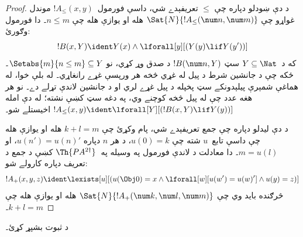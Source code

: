 \documentclass[../../../include/open-logic-section]{subfiles}
\begin{document}
\begin{proof}
د دې ښودلو دپاره چې $\le$ تعريفېدے شي، داسې فورمول~$!A_\le(x, y)$
موندل غواړو چې $\Sat{N}{!A_\le(\num n, \num m)}$ هله او يوازې هله
چې $n \le m$۔ دا فورمول وګورئ:
\[
!B(x, Y) \ident Y(x) \land \lforall[y][(Y(y) \lif Y(y'))]
\]
که د~$Y \subseteq \Nat$ سټ $!B(\num n, Y)$ د صدق وړ کړي، نو $\Setabs{m}{n \le m} \subseteq Y$۔ ځکه چې د جانشين شرط د پيل له غړي څخه هر ورپسې غړے رانغاړي۔ له بلې خوا، له هماغې شمېرې پيلېدونکے سټ پخپله د پيل غړے لري او د جانشين لاندې تړلے دے۔ نو هر هغه عدد چې له پيل څخه کوچنے وي، په دغه سټ کښې نشته؛ له دې امله
$!A_\le(x, y) \ident \lforall[Y][(!B(x, Y) \lif Y(y))]$ اخيستلے شو۔

د دې ليدلو دپاره چې جمع تعريفېدے شي، پام وکړئ چې $k+l=m$ هله او
يوازې هله چې داسې تابع~$u$ شته چې $u(0)=k$، د هر $n$ دپاره
$u(n')=u(n)'$، او $m = u(l)$۔ دا معادلت د لاندې فورمول په وسيله
په~$\Th{PA^{2\dagger}}$ کښې د جمع د تعريف دپاره کارولے شو:
\[
!A_+(x,y,z) \ident \lexists[u][(u(\Obj 0)=x \land \lforall[w][u(w')=u
 (w)'] \land u(y)=z)]
\] 
څرګنده بايد وي چې $\Sat{N}{!A_+(\num k, \num l, \num m)}$ هله او
يوازې هله چې $k+l=m$۔
\end{proof}

\begin{prob}
د  ثبوت بشپړ کړئ۔
\end{prob}
\end{document}
